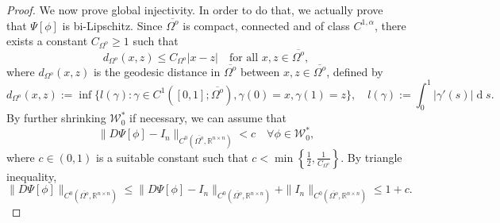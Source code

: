 \documentclass[11pt,reqno,a4paper]{amsart}
\theoremstyle{plain}
\theoremstyle{definition}
\newcommand{\R}{\mathbb{R}}
\renewcommand{\d}[1]{\ensuremath{\operatorname{d}\!{#1}}}
\begin{document}
\begin{proof}
    We now prove global injectivity. In order to do that, we actually prove that $\Psi[\phi]$ is bi-Lipschitz. Since $\overline{\Omega^o}$ is compact, connected and of class $C^{1,\alpha}$, there exists a constant $C_{\Omega^o} \geq 1$ such that 
    \[
    d_{\Omega^o}(x,z) \leq C_{\Omega^o}|x-z| \quad \text{for all } x,z\in\overline{\Omega^o},
    \] 
    where $d_{\Omega^o}(x,z)$ is the geodesic distance in $\overline{\Omega^o}$ between $x,z \in \overline{\Omega^o}$, defined by
    \[
    d_{\Omega^o}(x,z) := \inf \{ l(\gamma) \colon \gamma \in C^1([0,1]; \overline{\Omega^o}), \gamma(0) = x, \gamma(1) = z \}, \quad l(\gamma):= \int_{0}^{1} |\gamma'(s)| \d s.
    \]
    By further shrinking $\mathcal{W}^\ast_0$ if necessary, we can assume that 
    \begin{equation}\label{ineq D Psi[phi] - I  < c}
        \| D\Psi[\phi] - I_n \|_{C^{0}(\overline{\Omega^o}, \R^{n\times n})} < c \quad \forall \phi \in \mathcal{W}^\ast_0,
    \end{equation}
    where $c \in (0,1)$ is a suitable constant such that $ c < \min \left\{\frac{1}{2}, \frac{1}{C_{\Omega^o}} \right\} $. By triangle inequality,
    \[
    \|D \Psi[\phi] \|_{C^{0}(\overline{\Omega^o}, \R^{n\times n})} \leq \| D\Psi[\phi] - I_n \|_{C^{0}(\overline{\Omega^o}, \R^{n\times n})} + \|I_n \|_{C^{0}(\overline{\Omega^o}, \R^{n\times n})} \leq 1+c.
    \]
    

\end{proof}
\end{document}
